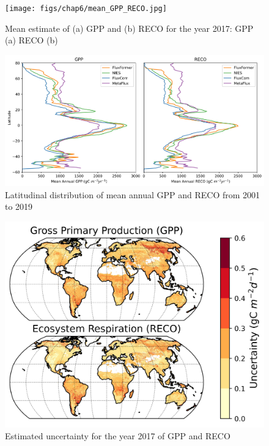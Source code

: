 \begin{figure}[tbh!]
    \centering
    \texttt{[image: figs/chap6/mean\_GPP\_RECO.jpg]}
    \caption[Mean estimate of GPP and RECO in 2017]{Mean estimate of (a) GPP and (b) RECO for the year 2017: GPP (a) RECO (b)}
    \label{fig:chap6_fig2}
\end{figure}
\begin{figure}[h!]
  \centering
  \includegraphics[width=\textwidth]{figs/chap6/lat_mean.jpg}
  \caption{Latitudinal distribution of mean annual GPP and RECO from 2001 to 2019}
  \label{fig:chap6_fig_lat_mean}
\end{figure}
\begin{figure}[h!]
  \centering
  \includegraphics[width=\textwidth]{figs/chap6/uncertainty.jpg}
  \caption{Estimated uncertainty for the year 2017 of GPP and RECO}
  \label{fig:chap6_fig_std}
\end{figure}

